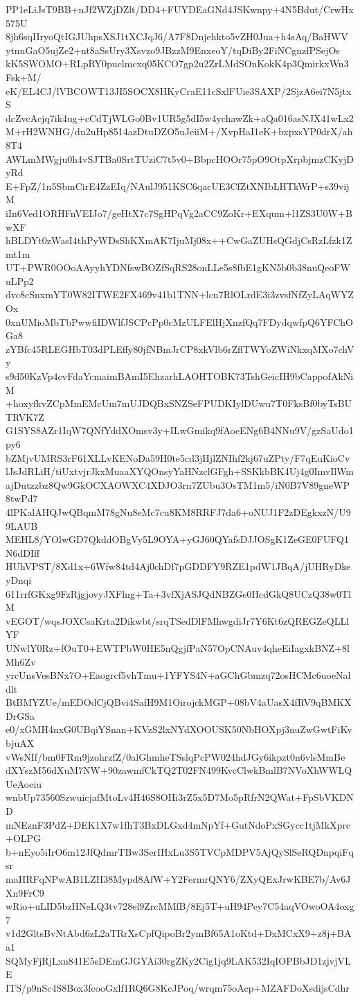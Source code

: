PP1eLiJsT9BB+nJf2WZjDZlt/DD4+FUYDEaGNd4JSKwnpy+4N5Bdut/CrwHx575U
8jh6sqIIryoQtIGJUhpsXSJ1tXCJqJ6/A7F8Dnjehkto5vZH0Jua+h4sAq/BaHWV
ytnnGaO5ujZe2+nt8aSsUry3Xsvzo9JBzzM9EnxeoY/tqDiBy2FiNCgnzfPSejOs
kK5SWOMO+RLpRY0puclmcxq05KCO7gp2u2ZrLMdSOnKokK4p3QmirkxWn3Fsk+M/
eK/EL4CJ/lVBCOWT13JI5SOCX8HKyCraE11cSxlFUie3SAXP/2SjzA6ei7N5jtxS
dcZvcAcjq7ik4ug+cCdTjWLGo0Bv1UR5g5dI5w4ychawZk+aQa016asNJX41wLx2
M+rH2WNHG/dn2uHp8514azDtuDZO5uJeiiM+/XvpHaI1eK+bxpxsYP0drX/ah8T4
AWLmMWgju0h4vSJTBa0SrtTUziC7t5v0+BbpcHOOr75pO9OtpXrpbjmzCKyjDyRd
E+FpZ/1n5SbmCirE4ZzEIq/NAulJ951KSC6qacUE3CfZtXNIbLHTkWrP+s39vijM
iIn6Ved1ORHFnVEIJo7/geHtX7c7SgHPqVg2aCC9ZoKr+EXqum+l1ZS3U0W+BwXF
hBLDYt0zWasI4thPyWDsShKXmAK7IjuMj08x++CwGaZUHsQGdjCsRzLfzk1Zmt1m
UT+PWR0OOoAAyyhYDNfswBOZfSqRS28onLLe5s8fbE1gKN5b0b38nuQeoFWuLPp2
dvc8cSnxmYT0W82ITWE2FX469v41b1TNN+lcn7RlOLrdE3i3zvsfNfZyLAqWYZOx
0xnUMioMbTbPwwfiIDWlfJSCPcPp0cMzULFElHjXnzfQq7FDydqwfpQ6YFChOGa8
zYBfc45RLEGHbT03dPLEffy80jfNBmJrCP8xkVlb6rZflTWYoZWiNkxqMXo7chVy
s9d50KzVp4cvFdaYcmaimBAmI5EhzarhLAOHTOBK73TshGeicIH9bCappofAkNiM
+hoxyfkvZCpMmEMcUm7mUJDQBxSNZSeFPUDKIylDUwu7T0FksBf0byTsBUTRVK7Z
G1SYS8AZr1IqW7QNfYddXOmsv3y+ILwGmikq9fAoeENg6B4NNu9V/gzSaUdo1py6
bZMjvUMRS3rF61XLLvKENoDa59H0te5cd3jHjlZNIhf2kj67uZPty/F7qEuKioCv
lJsJdRLiH/tiUxtvjrJkxMuaaXYQOnsyYaHNzclGFgh+SSKkbBK4Uj4g0ImvIlWm
ajDutzzbz8Qw9GkOCXAOWXC4XDJO3rn7ZUbu3OsTM1m5/iN0B7V89gneWP8twPd7
4lPKalAHQJwQBqmM78gNu8eMc7cu8KM8RRFJ7da6+oNUJ1F2zDEgkxzN/U99LAUB
MEHL8/YOlwGD7QkddOBgVy5L9OYA+yGJ60QYafsDJJOSgK1ZeGE0FUFQ1N6dDIff
HUhVPST/8Xd1x+6Wfw84td4Aj0chDf7pGDDFY9RZE1pdW1JBqA/jUHRyDkeyDnqi
611rrfGKxg9FzRjgjovyJXFlng+Ta+3vfXjASJQdNBZGe0HcdGkQ8UCzQ38w0TlM
vEGOT/wqsJOXCsaKrta2Dikwbt/srqTSedDlFMhwgdiJr7Y6Kt6zQREGZeQLLlYF
UNwlY0Rz+fOuT0+EWTPbW0HE5nQgjfPaN57OpCNAuv4qheEiIagxkBNZ+8lMh6Zv
yrcUnsVesBNx7O+Eaogrcf5vhTmu+1YFYS4N+aGChGbmzq72osHCMc6uoeNaldlt
BtBMYZUe/mEDOdCjQBvi4SafH9M1OirojckMGP+08bV4aUasX4fRV9qBMKXDrGSa
e0/xGMH4nxG0UBqiYSnan+KVzS2lxNYdXOOUSK50NbHOXpj3nuZwGwtFiKvbjuAX
vWsNIf/bm0FRm9jzohrzfZ/0alGhmheTSslqPcPW024hdJGy6ikpzt0n6vlsMmBe
dXYszM56dXuM7NW+90zawmfCkTQ2T02FN499KvcClwkBmlB7NVoXhWWLQUeAoeiu
wnbUp73560SzwuicjafMtoLv4H46S8OHi3rZ5x5D7Mo5pRfrN2QWat+FpSbVKDND
mNEznF3PdZ+DEK1X7w1fhT3BxDLGxd4mNpYf+GutNdoPxSGycc1tjMkXprc+OLPG
b+nEyo5iIrO6m12JfQdmrTBw3SerIHxLu3S5TVCpMDPV5AjQySlSeRQDnpqiFqsr
maHRFqNPwAB1LZH38Mypd8AfW+Y2FermrQNY6/ZXyQExJrwKBE7b/Av6JXn9FrC9
wRio+uLID5bzHNeLQ3tv728el9ZrcMMfB/8Ej5T+uH94Pey7C54aqVOwoOA4oxg7
v1d2GltsBvNtAbd6zL2aTRrXsCpfQipoBr2ymBf65A1oKtd+DxMCxX9+z8j+BAa1
SQMyFjRjLxn841E5sDEmGJGYAi30rgZKy2Cig1jq9LAK532IqIOPBbJD1zjvjVLE
ITS/p9nSc4S8Box3fcooGxlf1RQ6G8KcJPoq/wrqm75oAcp+MZAFDoXsdijsCdhr
